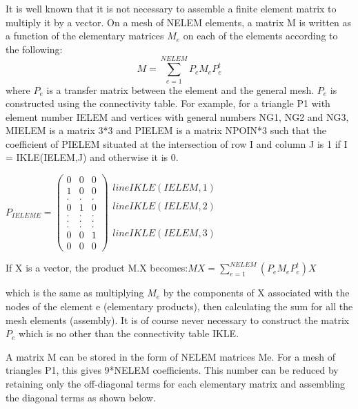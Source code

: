 It is well known that it is not necessary to assemble a finite element matrix
to multiply it by a vector. On a mesh of NELEM elements, a matrix M is written
as a function of the elementary matrices $M_{e}$ on each of the elements according
to the following:
\[M=\sum _{e=1}^{NELEM}P_{e} M_{e} P_{e}^{t}  \]
where $P_{e}$ is a transfer matrix between the element and the general mesh.
$P_{e}$ is constructed using the connectivity table. For example, for a
triangle P1 with element number IELEM and vertices with general numbers NG1,
NG2 and NG3, MIELEM is a matrix 3*3 and PIELEM is a matrix NPOIN*3 such that
the coefficient of PIELEM situated at the intersection of row I and column J is
1 if I = IKLE(IELEM,J) and otherwise it is 0.

$P_{IELEME}=\left(
  \begin{array}{ccc}
    0 & 0 & 0 \\
    1 & 0 & 0 \\
    . & . & . \\
    0 & 1 & 0 \\
    . & . & . \\
    . & . & . \\
    . & . & . \\
    0 & 0 & 1 \\
    0 & 0 & 0
  \end{array}
\right)
  \begin{array}{c}
    \\
    line IKLE(IELEM,1) \\
    \\
    line IKLE(IELEM,2) \\
    \\
    \\
    \\
    line IKLE(IELEM,3) \\
    \\
  \end{array}
$


If X is a vector, the product M.X becomes:$MX=\sum _{e=1}^{NELEM}(P_{e} M_{e}
P_{e}^{t} )X $

which is the same as multiplying $M_{e}$ by the components of X associated with the
nodes of the element e (elementary products), then calculating the sum for all
the mesh elements (assembly). It is of course never necessary to construct the
matrix $P_{e}$ which is no other than the connectivity table IKLE.

A matrix M can be stored in the form of NELEM matrices Me. For a mesh of
triangles P1, this gives 9*NELEM coefficients. This number can be reduced by
retaining only the off-diagonal terms for each elementary matrix and assembling
the diagonal terms as shown below.

